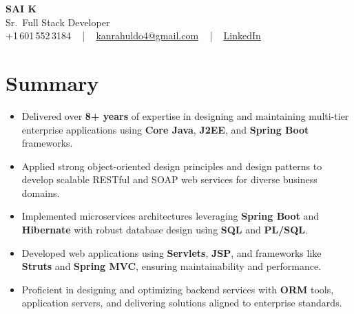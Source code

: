\documentclass[letterpaper,11pt]{article}
\newcommand{\resumeItem}[1]{
  \item\footnotesize{
    {#1 \vspace{-2pt}}
  }
}
\newcommand{\resumeItemListStart}{\begin{itemize}[leftmargin=*]}
\newcommand{\resumeItemListEnd}{\end{itemize}\vspace{-5pt}}
\begin{document}
\begin{center}
    {\fontsize{14pt}{12pt}\selectfont \textbf{\MakeUppercase{Sai K}}}\\ \vspace{2pt}
    \fontsize{10pt}{12pt}\selectfont Sr.\ Full Stack Developer\\ \vspace{2pt}
    \fontsize{10pt}{12pt}\selectfont +1\,601\,552\,3184 ~ | ~
    \href{mailto:kanrahuldo4@gmail.com}{kanrahuldo4@gmail.com} ~ | ~
    \href{https://www.linkedin.com/in/srrrk/}{\color{blue}\underline{LinkedIn}}
    \vspace{-10pt}
\end{center}

\section{Summary}
\fontsize{9pt}{10pt}\selectfont
\resumeItemListStart
  \resumeItem{Delivered over \textbf{8+ years} of expertise in designing and maintaining multi-tier enterprise applications using \textbf{Core Java}, \textbf{J2EE}, and \textbf{Spring Boot} frameworks.}
  \resumeItem{Applied strong object-oriented design principles and design patterns to develop scalable RESTful and SOAP web services for diverse business domains.}
  \resumeItem{Implemented microservices architectures leveraging \textbf{Spring Boot} and \textbf{Hibernate} with robust database design using \textbf{SQL} and \textbf{PL/SQL}.}
  \resumeItem{Developed web applications using \textbf{Servlets}, \textbf{JSP}, and frameworks like \textbf{Struts} and \textbf{Spring MVC}, ensuring maintainability and performance.}
  \resumeItem{Proficient in designing and optimizing backend services with \textbf{ORM} tools, application servers, and delivering solutions aligned to enterprise standards.}
\resumeItemListEnd
\vspace{-6pt}

\end{document}
